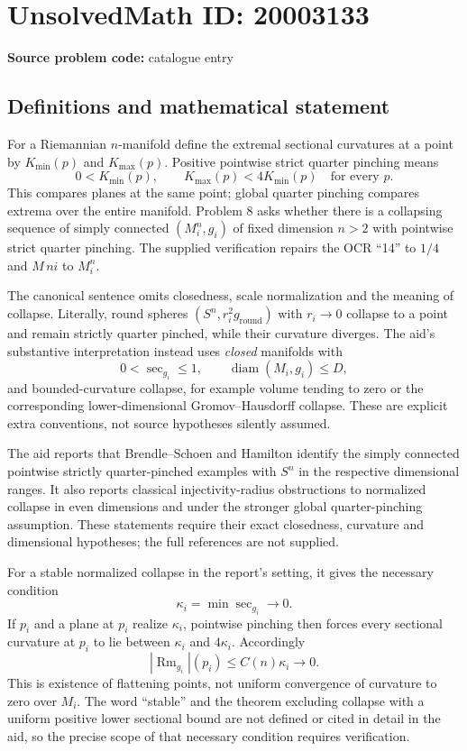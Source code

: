 \documentclass[11pt]{article}
\begin{document}
\section*{UnsolvedMath ID: 20003133}
\textbf{Source problem code:} catalogue entry
\subsection{Definitions and mathematical statement}
For a Riemannian $n$-manifold define the extremal sectional curvatures at a point by $K_{\min}(p)$ and $K_{\max}(p)$. Positive pointwise strict quarter pinching means
\[
 0<K_{\min}(p),\qquad K_{\max}(p)<4K_{\min}(p)
 \quad\text{for every }p.
\]
This compares planes at the same point; global quarter pinching compares extrema over the entire manifold. Problem 8 asks whether there is a collapsing sequence of simply connected $(M_i^n,g_i)$ of fixed dimension $n>2$ with pointwise strict quarter pinching. The supplied verification repairs the OCR ``14'' to $1/4$ and $M\,ni$ to $M_i^n$.

The canonical sentence omits closedness, scale normalization and the meaning of collapse. Literally, round spheres $(S^n,r_i^2g_{\mathrm{round}})$ with $r_i\to0$ collapse to a point and remain strictly quarter pinched, while their curvature diverges. The aid's substantive interpretation instead uses \emph{closed} manifolds with
\[
 0<\sec_{g_i}\leq1,\qquad\operatorname{diam}(M_i,g_i)\leq D,
\]
and bounded-curvature collapse, for example volume tending to zero or the corresponding lower-dimensional Gromov--Hausdorff collapse. These are explicit extra conventions, not source hypotheses silently assumed.

The aid reports that Brendle--Schoen and Hamilton identify the simply connected pointwise strictly quarter-pinched examples with $S^n$ in the respective dimensional ranges. It also reports classical injectivity-radius obstructions to normalized collapse in even dimensions and under the stronger global quarter-pinching assumption. These statements require their exact closedness, curvature and dimensional hypotheses; the full references are not supplied.

For a stable normalized collapse in the report's setting, it gives the necessary condition
\[
 \kappa_i=\min\sec_{g_i}\longrightarrow0.
\]
If $p_i$ and a plane at $p_i$ realize $\kappa_i$, pointwise pinching then forces every sectional curvature at $p_i$ to lie between $\kappa_i$ and $4\kappa_i$. Accordingly
\[
 |\operatorname{Rm}_{g_i}|(p_i)\leq C(n)\kappa_i\longrightarrow0.
\]
This is existence of flattening points, not uniform convergence of curvature to zero over $M_i$. The word ``stable'' and the theorem excluding collapse with a uniform positive lower sectional bound are not defined or cited in detail in the aid, so the precise scope of that necessary condition requires verification.
\end{document}
